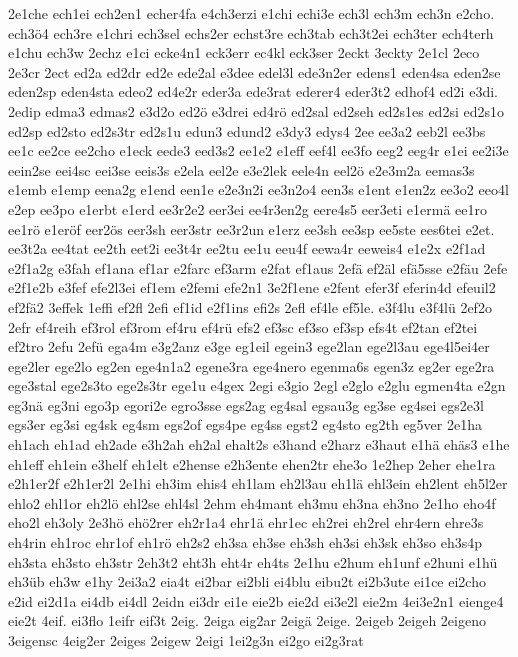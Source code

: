{2e1che
ech1ei
ech2en1
echer4fa
e4ch3erzi
e1chi
echi3e
ech3l
ech3m
ech3n
e2cho.
ech3ö4
ech3re
e1chri
ech3sel
echs2er
echst3re
ech3tab
ech3t2ei
ech3ter
ech4terh
e1chu
ech3w
2echz
e1ci
ecke4n1
eck3err
ec4kl
eck3ser
2eckt
3eckty
2e1cl
2eco
2e3cr
2ect
ed2a
ed2dr
ed2e
ede2al
e3dee
edel3l
ede3n2er
edens1
eden4sa
eden2se
eden2sp
eden4sta
edeo2
ed4e2r
eder3a
ede3rat
ederer4
eder3t2
edhof4
ed2i
e3di.
2edip
edma3
edmas2
e3d2o
ed2ö
e3drei
ed4rö
ed2sal
ed2seh
ed2s1es
ed2si
ed2s1o
ed2sp
ed2sto
ed2s3tr
ed2s1u
edun3
edund2
e3dy3
edys4
2ee
ee3a2
eeb2l
ee3bs
ee1c
ee2ce
ee2cho
e1eck
eede3
eed3s2
ee1e2
e1eff
eef4l
ee3fo
eeg2
eeg4r
e1ei
ee2i3e
eein2se
eei4sc
eei3se
eeis3s
e2ela
eel2e
e3e2lek
eele4n
eel2ö
e2e3m2a
eemas3s
e1emb
e1emp
eena2g
e1end
een1e
e2e3n2i
ee3n2o4
een3s
e1ent
e1en2z
ee3o2
eeo4l
e2ep
ee3po
e1erbt
e1erd
ee3r2e2
eer3ei
ee4r3en2g
eere4s5
eer3eti
e1ermä
ee1ro
ee1rö
e1eröf
eer2ös
eer3sh
eer3str
ee3r2un
e1erz
ee3sh
ee3sp
ee5ste
ees6tei
e2et.
ee3t2a
ee4tat
ee2th
eet2i
ee3t4r
ee2tu
ee1u
eeu4f
eewa4r
eeweis4
e1e2x
e2f1ad
e2f1a2g
e3fah
ef1ana
ef1ar
e2farc
ef3arm
e2fat
ef1aus
2efä
ef2äl
efä5sse
e2fäu
2efe
e2f1e2b
e3fef
efe2l3ei
ef1em
e2femi
efe2n1
3e2f1ene
e2fent
efer3f
eferin4d
efeuil2
ef2fä2
3effek
1effi
ef2fl
2efi
ef1id
e2f1ins
efi2s
2efl
ef4le
ef5le.
e3f4lu
e3f4lü
2ef2o
2efr
ef4reih
ef3rol
ef3rom
ef4ru
ef4rü
efs2
ef3sc
ef3so
ef3sp
efs4t
ef2tan
ef2tei
ef2tro
2efu
2efü
ega4m
e3g2anz
e3ge
eg1eil
egein3
ege2lan
ege2l3au
ege4l5ei4er
ege2ler
ege2lo
eg2en
ege4n1a2
egene3ra
ege4nero
egenma6s
egen3z
eg2er
ege2ra
ege3stal
ege2s3to
ege2s3tr
ege1u
e4gex
2egi
e3gio
2egl
e2glo
e2glu
egmen4ta
e2gn
eg3nä
eg3ni
ego3p
egori2e
egro3sse
egs2ag
eg4sal
egsau3g
eg3se
eg4sei
egs2e3l
egs3er
eg3si
eg4sk
eg4sm
egs2of
egs4pe
eg4ss
egst2
eg4sto
eg2th
eg5ver
2e1ha
eh1ach
eh1ad
eh2ade
e3h2ah
eh2al
ehalt2s
e3hand
e2harz
e3haut
e1hä
ehäs3
e1he
eh1eff
eh1ein
e3helf
eh1elt
e2hense
e2h3ente
ehen2tr
ehe3o
1e2hep
2eher
ehe1ra
e2h1er2f
e2h1er2l
2e1hi
eh3im
ehis4
eh1lam
eh2l3au
eh1lä
ehl3ein
eh2lent
eh5l2er
ehlo2
ehl1or
eh2lö
ehl2se
ehl4sl
2ehm
eh4mant
eh3mu
eh3na
eh3no
2e1ho
eho4f
eho2l
eh3oly
2e3hö
ehö2rer
eh2r1a4
ehr1ä
ehr1ec
eh2rei
eh2rel
ehr4ern
ehre3s
eh4rin
eh1roc
ehr1of
eh1rö
eh2s2
eh3sa
eh3se
eh3sh
eh3si
eh3sk
eh3so
eh3s4p
eh3sta
eh3sto
eh3str
2eh3t2
eht3h
eht4r
eh4ts
2e1hu
e2hum
eh1unf
e2huni
e1hü
eh3üb
eh3w
e1hy
2ei3a2
eia4t
ei2bar
ei2bli
ei4blu
eibu2t
ei2b3ute
ei1ce
ei2cho
e2id
ei2d1a
ei4db
ei4dl
2eidn
ei3dr
ei1e
eie2b
eie2d
ei3e2l
eie2m
4ei3e2n1
eienge4
eie2t
4eif.
ei3flo
1eifr
eif3t
2eig.
2eiga
eig2ar
2eigä
2eige.
2eigeb
2eigeh
2eigeno
3eigensc
4eig2er
2eiges
2eigew
2eigi
1ei2g3n
ei2go
ei2g3rat
}
